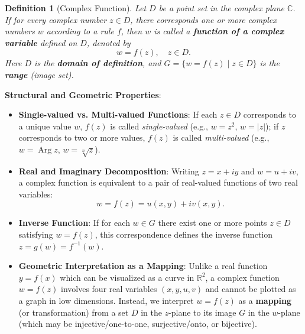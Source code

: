 \documentclass[11pt,a4paper]{article}
\theoremstyle{definitionbreak}
\newtheorem{definition}{Definition}
\theoremstyle{examplebreak}
\theoremstyle{plain}
\begin{document}
\begin{definition}[Complex Function]
Let $D$ be a point set in the complex plane $\mathbb{C}$. If for every complex number $z \in D$, there corresponds one or more complex numbers $w$ according to a rule $f$, then $w$ is called a \textbf{function of a complex variable} defined on $D$, denoted by
\[
    w = f(z), \quad z \in D.
\]
Here $D$ is the \textbf{domain of definition}, and $G = \{ w = f(z) \mid z \in D \}$ is the \textbf{range} (image set).
\end{definition}

\textbf{Structural and Geometric Properties}:
\begin{itemize}
    \item \textbf{Single-valued vs. Multi-valued Functions}: If each $z \in D$ corresponds to a unique value $w$, $f(z)$ is called \emph{single-valued} (e.g., $w = z^2$, $w = |z|$); if $z$ corresponds to two or more values, $f(z)$ is called \emph{multi-valued} (e.g., $w = \operatorname{Arg} z$, $w = \sqrt[n]{z}$).
    \item \textbf{Real and Imaginary Decomposition}: Writing $z = x + iy$ and $w = u + iv$, a complex function is equivalent to a pair of real-valued functions of two real variables:
    \[
        w = f(z) = u(x, y) + i v(x, y).
    \]
    \item \textbf{Inverse Function}: If for each $w \in G$ there exist one or more points $z \in D$ satisfying $w = f(z)$, this correspondence defines the inverse function $z = g(w) = f^{-1}(w)$.
    \item \textbf{Geometric Interpretation as a Mapping}: Unlike a real function $y = f(x)$ which can be visualized as a curve in $\mathbb{R}^2$, a complex function $w = f(z)$ involves four real variables $(x, y, u, v)$ and cannot be plotted as a graph in low dimensions. Instead, we interpret $w = f(z)$ as a \textbf{mapping} (or transformation) from a set $D$ in the $z$-plane to its image $G$ in the $w$-plane (which may be injective/one-to-one, surjective/onto, or bijective).
\end{itemize}
\end{document}
